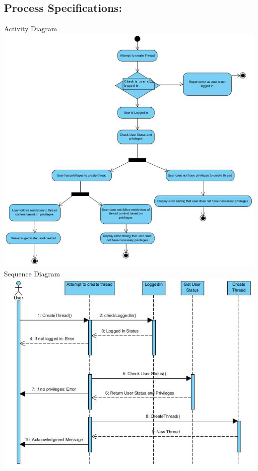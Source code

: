 \documentclass[a4paper,11pt]{article}
\begin{document}
\subsection{Process Specifications:} 
Activity Diagram\\
\includegraphics[width=1\linewidth]{./Images/CRUDThread/Diagrams/3.jpg}\\
\newpage
Sequence Diagram\\
\includegraphics[width=1\linewidth]{./Images/CRUDThread/Diagrams/4.jpg}\\
\end{document}
